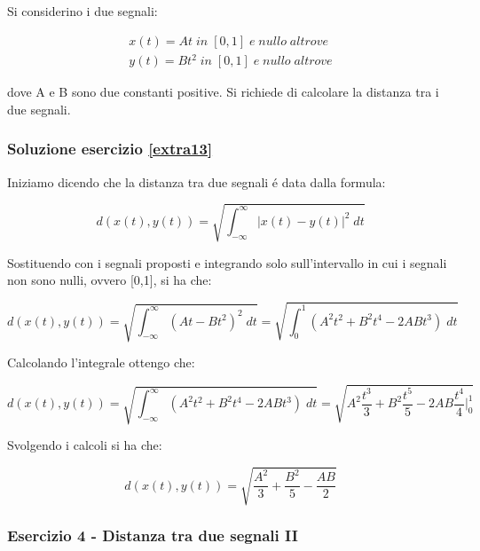 \documentclass[../main.tex]{subfiles}
\begin{document}
Si considerino i due segnali:

\begin{equation*}
\begin{split}
	x(t) = At \; \unit{in\;} [0,1] \; \unit{e\; nullo\; altrove}\\
	y(t) = Bt^2 \; \unit{in\;} [0,1] \; \unit{e\; nullo\; altrove}
\end{split}
\end{equation*}

dove A e B sono due constanti positive. Si richiede di calcolare la distanza tra i due segnali.


\subsubsection*{Soluzione esercizio \ref{extra13}}

Iniziamo dicendo che la distanza tra due segnali é data dalla formula:

\begin{equation}
	d(x(t), y(t)) = \sqrt{\int_{-\infty}^{\infty} |x(t) - y(t)|^2\; dt}
\end{equation}

Sostituendo con i segnali proposti e integrando solo sull'intervallo in cui i segnali non sono nulli, ovvero [0,1], si ha che:

\begin{equation}
	d(x(t), y(t)) = \sqrt{\int_{-\infty}^\infty (At - Bt^2)^2 \;dt} = \sqrt{\int_{0}^1  (A^2t^2 + B^2t^4 - 2ABt^3) \;dt}
\end{equation}

Calcolando l'integrale ottengo che:

\begin{equation}
	d(x(t), y(t)) = \sqrt{\int_{-\infty}^\infty  (A^2t^2 + B^2t^4 - 2ABt^3) \;dt} = \sqrt{A^2 \frac{t^3}{3} + B^2 \frac{t^5}{5} - 2AB \frac{t^4}{4} \bigg|_0^1}
\end{equation}

Svolgendo i calcoli si ha che:

\begin{equation}
	d(x(t), y(t)) = \sqrt{\frac{A^2}{3} + \frac{B^2}{5} -\frac{AB}{2}}
\end{equation}



\vspace*{1.5cm}
\subsubsection{Esercizio 4 - Distanza tra due segnali II}
\label{extra14}
\end{document}
